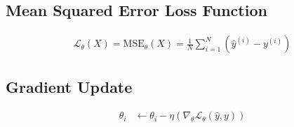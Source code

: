 \documentclass{article}
\begin{document}
\subsection{Mean Squared Error Loss Function}
\begin{align}
	\mathcal{L}_\theta(X) =
	\text{MSE}_\theta(X) =
	\frac{1}{N} \sum_{i=1}^{N}{ (\hat{y}^{(i)} - y^{(i)} )}
\end{align}

\subsection{Gradient Update}
\begin{align}
	\theta_i & \gets \theta_i - \eta (\nabla_\theta \mathcal{L}_{\theta}(\hat{y}, y))
\end{align}
\end{document}
